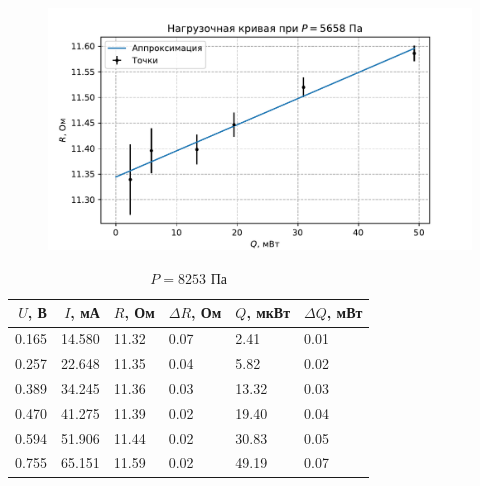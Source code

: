 \begin{figure}[H]\centering\includegraphics[width=\textwidth]{graphs/RQ5657.8637324185265.pdf}\end{figure}\begin{table}[H]
\centering
\caption{$P = 8253$ Па}
\begin{tabular}{rrllll}
\hline
 $U$, В &  $I$, мА &     $R$, Ом & $\Delta R$, Ом &     $Q$, мкВт & $\Delta Q$, мВт \\ \hline
0.165 & 14.580 & 11.32 &           0.07 &  2.41 &            0.01 \\ \hline
0.257 & 22.648 & 11.35 &           0.04 &  5.82 &            0.02 \\ \hline
0.389 & 34.245 & 11.36 &           0.03 & 13.32 &            0.03 \\ \hline
0.470 & 41.275 & 11.39 &           0.02 & 19.40 &            0.04 \\ \hline
0.594 & 51.906 & 11.44 &           0.02 & 30.83 &            0.05 \\ \hline
0.755 & 65.151 & 11.59 &           0.02 & 49.19 &            0.07 \\ \hline
\end{tabular}
\end{table}
